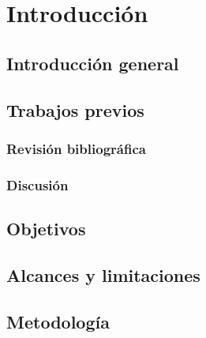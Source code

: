  
\chapter{Introducción}
\section{Introducción general}

\section{Trabajos previos}

\subsection{Revisión bibliográfica}

\subsection{Discusión}

\section{Objetivos}

\section{Alcances y limitaciones}

\section{Metodología}